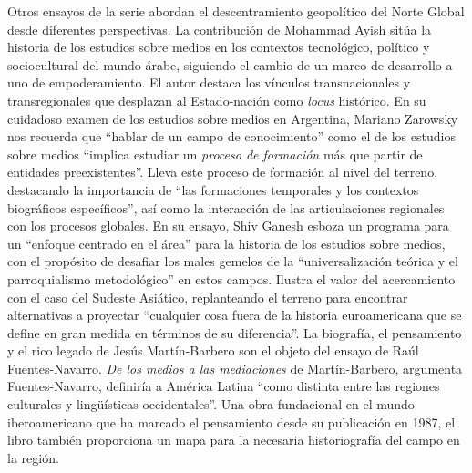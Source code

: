 \documentclass{tufte-handout}
\begin{document}
Otros ensayos de la serie abordan el descentramiento geopolítico del
Norte Global desde diferentes perspectivas. La contribución de Mohammad
Ayish sitúa la historia de los estudios sobre medios en los contextos
tecnológico, político y sociocultural del mundo árabe, siguiendo el
cambio de un marco de desarrollo a uno de empoderamiento. El autor
destaca los vínculos transnacionales y transregionales que desplazan al
Estado-nación como \emph{locus} histórico. En su cuidadoso examen de los
estudios sobre medios en Argentina, Mariano Zarowsky nos recuerda que
``hablar de un campo de conocimiento'' como el de los estudios sobre
medios ``implica estudiar un \emph{proceso de formación} más que partir
de entidades preexistentes''. Lleva este proceso de formación al nivel
del terreno, destacando la importancia de ``las formaciones temporales y
los contextos biográficos específicos'', así como la interacción de las
articulaciones regionales con los procesos globales. En su ensayo, Shiv
Ganesh esboza un programa para un ``enfoque centrado en el área'' para
la historia de los estudios sobre medios, con el propósito de desafiar
los males gemelos de la ``universalización teórica y el parroquialismo
metodológico'' en estos campos. Ilustra el valor del acercamiento con el
caso del Sudeste Asiático, replanteando el terreno para encontrar
alternativas a proyectar ``cualquier cosa fuera de la historia
euroamericana que se define en gran medida en términos de su
diferencia''. La biografía, el pensamiento y el rico legado de Jesús
Martín-Barbero son el objeto del ensayo de Raúl Fuentes-Navarro.
\emph{De los medios a las mediaciones} de Martín-Barbero, argumenta
Fuentes-Navarro, definiría a América Latina ``como distinta entre las
regiones culturales y lingüísticas occidentales''. Una obra fundacional
en el mundo iberoamericano que ha marcado el pensamiento desde su
publicación en 1987, el libro también proporciona un mapa para la
necesaria historiografía del campo en la región.
\end{document}
